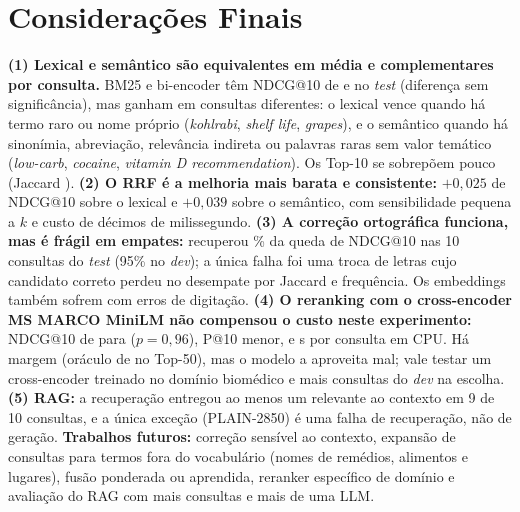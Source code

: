 \section{Considerações Finais}
\textbf{(1) Lexical e semântico são equivalentes em média e complementares por consulta.} BM25 e bi-encoder têm NDCG@10 de \NdcgTenLex{} e \NdcgTenSem{} no \emph{test} (diferença sem significância), mas ganham em consultas diferentes: o lexical vence quando há termo raro ou nome próprio (\emph{kohlrabi}, \emph{shelf life}, \emph{grapes}), e o semântico quando há sinonímia, abreviação, relevância indireta ou palavras raras sem valor temático (\emph{low-carb}, \emph{cocaine}, \emph{vitamin D recommendation}). Os Top-10 se sobrepõem pouco (Jaccard \OverlapTop).
\textbf{(2) O RRF é a melhoria mais barata e consistente:} $+0{,}025$ de NDCG@10 sobre o lexical e $+0{,}039$ sobre o semântico, com sensibilidade pequena a $k$ e custo de décimos de milissegundo.
\textbf{(3) A correção ortográfica funciona, mas é frágil em empates:} recuperou \TypoRecAgg\% da queda de NDCG@10 nas 10 consultas do \emph{test} (95\% no \emph{dev}); a única falha foi uma troca de letras cujo candidato correto perdeu no desempate por Jaccard e frequência. Os embeddings também sofrem com erros de digitação.
\textbf{(4) O reranking com o cross-encoder MS MARCO MiniLM não compensou o custo neste experimento:} NDCG@10 de \NdcgTenHyb{} para \NdcgTenRr{} ($p=0{,}96$), P@10 menor, e \CEMsQuery{} s por consulta em CPU. Há margem (oráculo de \OracleNdcg{} no Top-50), mas o modelo a aproveita mal; vale testar um cross-encoder treinado no domínio biomédico e mais consultas do \emph{dev} na escolha.
\textbf{(5) RAG:} a recuperação entregou ao menos um relevante ao contexto em 9 de 10 consultas, e a única exceção (PLAIN-2850) é uma falha de recuperação, não de geração. 
\textbf{Trabalhos futuros:} correção sensível ao contexto, expansão de consultas para termos fora do vocabulário (nomes de remédios, alimentos e lugares), fusão ponderada ou aprendida, reranker específico de domínio e avaliação do RAG com mais consultas e mais de uma LLM.
